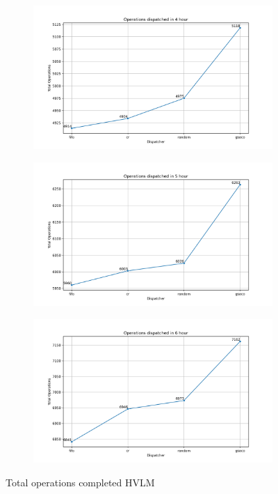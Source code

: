 \begin{figure}[t]
\begin{subfigure}{0.32\textwidth}
		\caption{}
		\label{fig:o3}
	\end{subfigure}
	\begin{subfigure}{0.32\textwidth}
		\includegraphics[width=\textwidth]{HVLM/total_operations_14400s.png}
		\caption{}
		\label{fig:o4}
	\end{subfigure}\hfill
	\begin{subfigure}{0.32\textwidth}
		\includegraphics[width=\textwidth]{HVLM/total_operations_18000s.png}
		\caption{}
		\label{fig:o5}
	\end{subfigure}\hfill
	\begin{subfigure}{0.32\textwidth}
		\includegraphics[width=\textwidth]{HVLM/total_operations_21600s.png}
		\caption{}
		\label{fig:o6}
	\end{subfigure}
	\caption{Total operations completed HVLM}
	\label{fig:totalopsHVLM}
\end{figure}

